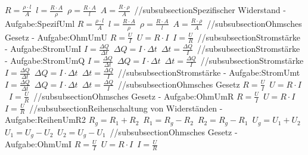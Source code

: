 $ R = \frac{\rho \cdot l}{ A} $\ 
$ l = \frac{R\cdot A}{ \rho } $\ 
$ \rho  = \frac{R\cdot A}{ l} $\ 
$ A = \frac{R\cdot \rho }{ A} $\ 
//subsubsection{Spezifischer Widerstand - Aufgabe:SpezifUml} 
$ R = \frac{\rho \cdot l}{ A} $\ 
$ l = \frac{R\cdot A}{ \rho } $\ 
$ \rho  = \frac{R\cdot A}{ l} $\ 
$ A = \frac{R\cdot \rho }{ A} $\ 
//subsubsection{Ohmsches Gesetz - Aufgabe:OhmUmU} 
$ R = \frac{U}{I} $\ 
$ U = R\cdot I $\ 
$ I = \frac{U}{R} $\ 
//subsubsection{Stromstärke - Aufgabe:StromUmI} 
$ I = \frac{\Delta Q}{\Delta t} $\ 
$ \Delta Q =I\cdot \Delta t $\ 
$ \Delta t = \frac{\Delta Q}{I} $\ 
//subsubsection{Stromstärke - Aufgabe:StromUmQ} 
$ I = \frac{\Delta Q}{\Delta t} $\ 
$ \Delta Q =I\cdot \Delta t $\ 
$ \Delta t = \frac{\Delta Q}{I} $\ 
//subsubsection{Stromstärke} 
$ I = \frac{\Delta Q}{\Delta t} $\ 
$ \Delta Q =I\cdot \Delta t $\ 
$ \Delta t = \frac{\Delta Q}{I} $\ 
//subsubsection{Stromstärke - Aufgabe:StromUmt} 
$ I = \frac{\Delta Q}{\Delta t} $\ 
$ \Delta Q =I\cdot \Delta t $\ 
$ \Delta t = \frac{\Delta Q}{I} $\ 
//subsubsection{Ohmsches Gesetz} 
$ R = \frac{U}{I} $\ 
$ U = R\cdot I $\ 
$ I = \frac{U}{R} $\ 
//subsubsection{Ohmsches Gesetz - Aufgabe:OhmUmR} 
$ R = \frac{U}{I} $\ 
$ U = R\cdot I $\ 
$ I = \frac{U}{R} $\ 
//subsubsection{Reihenschaltung von Widerständen - Aufgabe:ReihenUmR2} 
$ R_{g}  = R_{1}  + R_{2} $\ 
$ R_{1}  = R_{g}  - R_{2} $\ 
$ R_{2}  = R_{g}  - R_{1} $\ 
$ U_{g}  = U_{1}  + U_{2} $\ 
$ U_{1}  = U_{g}  - U_{2} $\ 
$ U_{2}  = U_{g}  - U_{1} $\ 
//subsubsection{Ohmsches Gesetz - Aufgabe:OhmUmI} 
$ R = \frac{U}{I} $\ 
$ U = R\cdot I $\ 
$ I = \frac{U}{R} $\ 
